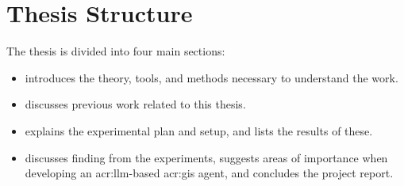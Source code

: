 \section{Thesis Structure}
\label{sec:thesisStructure}

The thesis is divided into four main sections:
\begin{itemize}
    \item {} introduces the theory, tools, and methods necessary to understand the work.
    \item {} discusses previous work related to this thesis.
    \item {} explains the experimental plan and setup, and lists the results of these.
    \item {} discusses finding from the experiments, suggests areas of importance when developing an \acrshort{acr:llm}-based \acrshort{acr:gis} agent, and concludes the project report.
\end{itemize}

\glsresetall